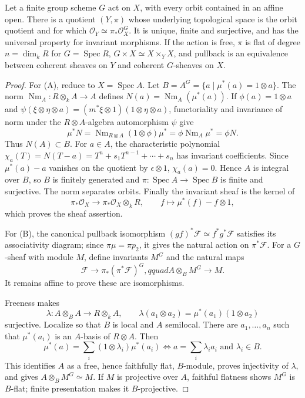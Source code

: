 \begin{theorem}
\label{mumford-thm-finite-groupscheme-quotient}
Let a finite group scheme $G$ act on $X$, with every orbit contained in an
affine open. There is a quotient $(Y,\pi)$ whose underlying topological
space is the orbit quotient and for which
$\mathcal O_Y\simeq\pi_*\mathcal O_X^G$. It is unique, finite and
surjective, and has the universal property for invariant morphisms.
If the action is free, $\pi$ is flat of degree $n=\dim_kR$ for
$G=\operatorname{Spec}R$, $G\times X\simeq X\times_YX$, and pullback is an
equivalence between coherent sheaves on $Y$ and coherent $G$-sheaves on $X$.
\end{theorem}
\begin{proof}
For (A), reduce to $X=\operatorname{Spec}A$. Let
$B=A^G=\{a\mid\mu^*(a)=1\otimes a\}$. The norm
$\operatorname{Nm}_A:R\otimes_kA\to A$ defines
$N(a)=\operatorname{Nm}_A(\mu^*(a))$. If
$\phi(a)=1\otimes a$ and
$\psi(\xi\otimes\eta\otimes a)=(m^*\xi\otimes1)(1\otimes\eta\otimes a)$,
functoriality and invariance of norm under the $R\otimes A$-algebra
automorphism $\psi$ give
\[
\mu^*N=\operatorname{Nm}_{R\otimes A}(1\otimes\phi)\mu^*
=\phi\operatorname{Nm}_A\mu^*=\phi N.
\]
Thus $N(A)\subset B$. For $a\in A$, the characteristic polynomial
$\chi_a(T)=N(T-a)=T^n+s_1T^{n-1}+\cdots+s_n$ has invariant coefficients.
Since $\mu^*(a)-a$ vanishes on the quotient by $\epsilon\otimes1$,
$\chi_a(a)=0$. Hence $A$ is integral over $B$, so $B$ is finitely generated
and $\pi:\operatorname{Spec}A\to\operatorname{Spec}B$ is finite and
surjective. The norm separates orbits. Finally the invariant sheaf is the
kernel of
\[
\pi_*\mathcal O_X\longrightarrow\pi_*\mathcal O_X\otimes_kR,
\qquad f\longmapsto\mu^*(f)-f\otimes1,
\]
which proves the sheaf assertion.

For (B), the canonical pullback isomorphism
$(g f)^*\mathcal F\simeq f^*g^*\mathcal F$ satisfies its associativity
diagram; since $\pi\mu=\pi p_2$, it gives the natural action on
$\pi^*\mathcal F$. For a $G$-sheaf with module $M$, define invariants
$M^G$ and the natural maps
\[
\mathcal F\to\pi_*(\pi^*\mathcal F)^G,qquad
A\otimes_BM^G\to M.
\]
It remains affine to prove these are isomorphisms.

Freeness makes
\[
\lambda:A\otimes_BA\to R\otimes_kA,\qquad
\lambda(a_1\otimes a_2)=\mu^*(a_1)(1\otimes a_2)
\]
surjective. Localize so that $B$ is local and $A$ semilocal. There are
$a_1,\ldots,a_n$ such that $\mu^*(a_i)$ is an $A$-basis of $R\otimes A$.
Then
\[
\mu^*(a)=\sum_i(1\otimes\lambda_i)\mu^*(a_i)
\Longleftrightarrow a=\sum_i\lambda_i a_i\text{ and }\lambda_i\in B.
\]
This identifies $A$ as a free, hence faithfully flat, $B$-module, proves
injectivity of $\lambda$, and gives $A\otimes_BM^G\simeq M$. If $M$ is
projective over $A$, faithful flatness shows $M^G$ is $B$-flat; finite
presentation makes it $B$-projective.
\end{proof}

